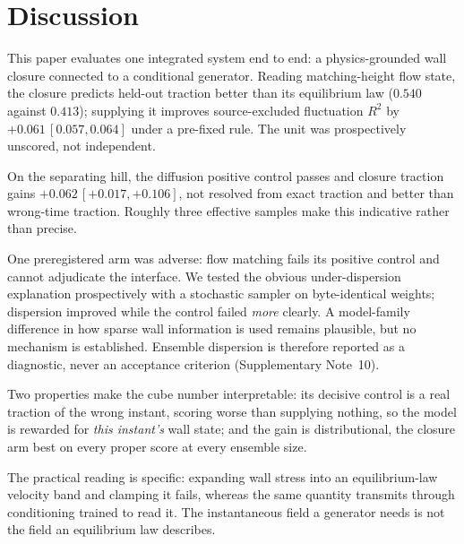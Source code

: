 \section{Discussion}\label{sec:discussion}

This paper evaluates one integrated system end to end: a physics-grounded wall closure connected
to a conditional generator.
Reading matching-height flow state, the closure predicts held-out traction better than its
equilibrium law ($0.540$ against $0.413$); supplying it improves source-excluded fluctuation
$R^2$ by $+0.061\,[0.057,0.064]$ under a pre-fixed rule. The unit was prospectively unscored,
not independent.

On the separating hill, the diffusion positive control passes and closure traction gains
$+0.062\,[+0.017,+0.106]$, not resolved from exact traction and better than wrong-time
traction. Roughly three effective samples make this indicative rather than precise.

One preregistered arm was adverse: flow matching fails its positive control and cannot adjudicate
the interface. We tested the obvious under-dispersion explanation prospectively with a stochastic
sampler on byte-identical weights; dispersion improved while the control failed \emph{more}
clearly. A model-family difference in how sparse wall information is used remains plausible, but
no mechanism is established. Ensemble dispersion is therefore reported as a diagnostic, never an
acceptance criterion (Supplementary Note~10).

Two properties make the cube number interpretable: its decisive
control is a real traction of the wrong instant, scoring worse than supplying nothing, so the
model is rewarded for \emph{this instant's} wall state; and the gain is distributional, the
closure arm best on every proper score at every ensemble size.

The practical reading is specific: expanding wall stress into an equilibrium-law velocity band
and clamping it fails, whereas the same quantity transmits through conditioning trained to read
it. The instantaneous field a generator needs is not the field an equilibrium law describes.


